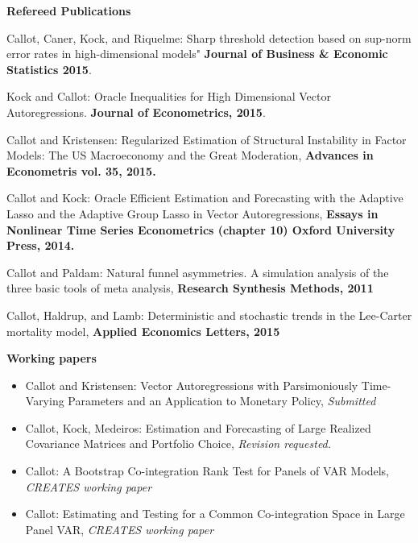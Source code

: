 \documentclass[10pt]{article}
\newenvironment{outerlist}[1][\enskip\textbullet]%
        {\begin{itemize}[#1]}{\end{itemize}%
         \vspace{-.1\baselineskip}}
\newenvironment{innerlist}[1][\enskip\textbullet]%
        {\begin{compactitem}[#1]}{\end{compactitem}}
\begin{document}
\begin{outerlist}
\item[] \textbf{Refereed Publications}\\
    \begin{innerlist}
\item[Callot, Caner, Kock, and Riquelme:] Sharp threshold detection based on sup-norm error rates in high-dimensional models" \textbf{Journal of Business \& Economic Statistics 2015}.
\item[Kock and Callot:] {Oracle Inequalities for High Dimensional Vector Autoregressions}. \textbf{Journal of Econometrics, 2015}.
\item[Callot and Kristensen:] {Regularized Estimation of Structural Instability in Factor Models: The US Macroeconomy and the Great Moderation}, \textbf{Advances in Econometris vol. 35, 2015.}
\item[Callot and Kock:] {Oracle Efficient Estimation and Forecasting with the Adaptive Lasso and the Adaptive Group Lasso in Vector Autoregressions}, \textbf{Essays in Nonlinear Time Series Econometrics (chapter 10) Oxford University Press, 2014.}
\item[Callot and Paldam:] {Natural funnel asymmetries. A simulation analysis of the three basic tools of meta analysis}, \textbf{Research Synthesis Methods, 2011}
\item[Callot, Haldrup, and Lamb:] {Deterministic and stochastic trends in the Lee-Carter mortality model}, \textbf{Applied Economics Letters, 2015}

    \end{innerlist}

\item[] \textbf{Working papers}\\
    \begin{outerlist}
\item[]Callot and Kristensen: {Vector Autoregressions with Parsimoniously Time-Varying Parameters and an Application to Monetary Policy}, \textit{Submitted}

\item[]Callot, Kock, Medeiros: {Estimation and Forecasting of Large Realized Covariance Matrices and Portfolio Choice}, \textit{Revision requested.}
\item[]Callot: {A Bootstrap Co-integration Rank Test for Panels of VAR Models}, \textit{CREATES working paper}
\item[]Callot: {Estimating and Testing for a Common Co-integration Space in Large Panel VAR}, \textit{CREATES working paper}
    \end{outerlist}



\end{outerlist}
\end{document}
